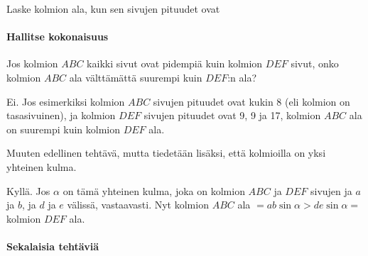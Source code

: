 \begin{tehtavasivu}
\begin{tehtava}
Laske kolmion ala, kun sen sivujen pituudet ovat
\begin{alakohdat}
\end{alakohdat}
\begin{vastaus}
\begin{alakohdat}
\end{alakohdat}
\end{vastaus}
\end{tehtava}

\paragraph*{Hallitse kokonaisuus}

\begin{tehtava}
Jos kolmion $ABC$ kaikki sivut ovat pidempiä kuin kolmion $DEF$ sivut, onko kolmion $ABC$ ala välttämättä suurempi kuin $DEF$:n ala?
\begin{vastaus}
Ei. Jos esimerkiksi kolmion $ABC$ sivujen pituudet ovat kukin 8 (eli kolmion on tasasivuinen), ja kolmion $DEF$ sivujen pituudet ovat 9, 9 ja 17, kolmion $ABC$ ala on suurempi kuin kolmion $DEF$ ala.
\end{vastaus}
\end{tehtava}

\begin{tehtava}
Muuten edellinen tehtävä, mutta tiedetään lisäksi, että kolmioilla on yksi yhteinen kulma.
\begin{vastaus}
Kyllä. Jos $\alpha$ on tämä yhteinen kulma, joka on kolmion $ABC$ ja $DEF$ sivujen ja $a$ ja $b$, ja $d$ ja $e$ välissä, vastaavasti. Nyt kolmion $ABC$ ala $= ab \sin \alpha > de \sin \alpha =$ kolmion $DEF$ ala. 
\end{vastaus}
\end{tehtava}

\paragraph*{Sekalaisia tehtäviä}




\end{tehtavasivu}
